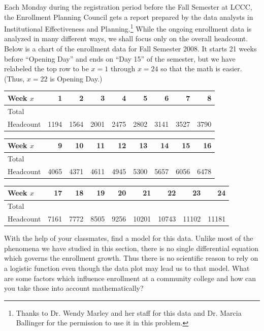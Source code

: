 \documentclass{ximera}
\begin{document}
\begin{problem}
    
 Each Monday during the registration period before the Fall Semester at LCCC, the Enrollment Planning Council gets a report prepared by the data analysts in Institutional Effectiveness and Planning.\footnote{Thanks to Dr. Wendy Marley and her staff for this data and Dr. Marcia Ballinger for the permission to use it  in this problem.}  While the ongoing enrollment data is analyzed in many different ways, we shall focus only on the overall headcount.  Below is a chart of the enrollment data for Fall Semester 2008.  It starts 21 weeks before ``Opening Day'' and ends on ``Day 15'' of the semester, but we have relabeled the top row to be $x = 1$ through $x = 24$ so that the math is easier.  (Thus, $x = 22$ is Opening Day.)


\begin{tabular}{|l|r|r|r|r|r|r|r|r|} \hline
Week $x$ & 1 & 2 & 3 & 4 & 5 & 6 & 7 & 8 \\ \hline 
Total  & & & & & & & & \\
Headcount & 1194 & 1564 & 2001 & 2475 & 2802 & 3141 & 3527 & 3790 \\ \hline
\end{tabular}

\begin{tabular}{|l|r|r|r|r|r|r|r|r|} \hline
Week $x$ & 9 & 10 & 11 & 12 & 13 & 14 & 15 & 16 \\ \hline 
Total  & & & & & & & & \\
Headcount & 4065 & 4371 & 4611 & 4945 & 5300 & 5657 & 6056 & 6478 \\ \hline
\end{tabular}

\begin{tabular}{|l|r|r|r|r|r|r|r|r|} \hline
Week $x$ & 17 & 18 & 19 & 20 & 21 & 22 & 23 & 24\\ \hline 
Total  & & & & & & & & \\
Headcount & 7161 & 7772 & 8505 & 9256 & 10201 & 10743 & 11102 & 11181 \\ \hline
\end{tabular}


With the help of your classmates, find a model for this data.  Unlike most of the phenomena we have studied in this section, there is no single differential equation which governs the enrollment growth.  Thus there is no scientific reason to rely on a logistic function even though the data plot may lead us to that model.  What are some factors which influence enrollment at a community college and how can you take those into account mathematically?  

\end{problem}
\end{document}

